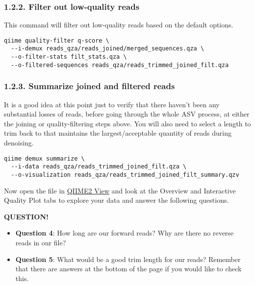 \documentclass[
]{book}
\providecommand{\tightlist}{%
  \setlength{\itemsep}{0pt}\setlength{\parskip}{0pt}}
\newenvironment{bluebox}{
  \definecolor{shadecolor}{RGB}{172, 210, 237}
  \color{white}
  \begin{shaded}}
 {\end{shaded}}
\begin{document}
\subsubsection{1.2.2. Filter out low-quality reads}\label{filter-out-low-quality-reads}

This command will filter out low-quality reads based on the default options.

\begin{verbatim}
qiime quality-filter q-score \
  --i-demux reads_qza/reads_joined/merged_sequences.qza \
  --o-filter-stats filt_stats.qza \
  --o-filtered-sequences reads_qza/reads_trimmed_joined_filt.qza
\end{verbatim}

\subsubsection{1.2.3. Summarize joined and filtered reads}\label{summarize-joined-and-filtered-reads}

It is a good idea at this point just to verify that there haven't been any substantial losses of reads, before going through the whole ASV process, at either the joining or quality-filtering steps above. You will also need to select a length to trim back to that maintains the largest/acceptable quantity of reads during denoising.

\begin{verbatim}
qiime demux summarize \
  --i-data reads_qza/reads_trimmed_joined_filt.qza \
  --o-visualization reads_qza/reads_trimmed_joined_filt_summary.qzv
\end{verbatim}

Now open the file in \href{https://view.qiime2.org/}{QIIME2 View} and look at the Overview and Interactive Quality Plot tabs to explore your data and answer the following questions.

\begin{bluebox}

\begin{center}
\textbf{QUESTION!}

\end{center}

\begin{itemize}
\tightlist
\item
  \textbf{Question 4}: How long are our forward reads? Why are there no reverse reads in our file?
\item
  \textbf{Question 5}: What would be a good trim length for our reads? Remember that there are answers at the bottom of the page if you would like to check this.
\end{itemize}

\end{bluebox}
\end{document}
